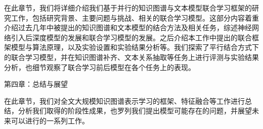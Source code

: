 在此章节，我们将详细介绍我们基于并行的知识图谱与文本模型联合学习框架的研究工作，包括研究背景、主要问题与挑战、相关的联合学习模型。这部分内容着重介绍过去几年中被提出的知识图谱和文本模型的结合方法及相关任务，综述神经网络引入后深度模型的发展和联合学习模型的发展。之后介绍本工作中提出的联合框架模型与算法原理，以及实验设置和实验结果分析等。我们探索了平行结合方式下的联合学习模型，并在知识图谱补齐、文本关系抽取等任务上进行评测与实验结果分析，也细节观察了联合学习前后模型在各个任务上的表现。

第四章：总结与展望

在此章节，我们对全文大规模知识图谱表示学习的框架、特征融合等工作进行总结，分析我们取得的阶段性成果，也罗列我们提出模型可能存在的问题，并展望未来可以进行的一系列工作。

